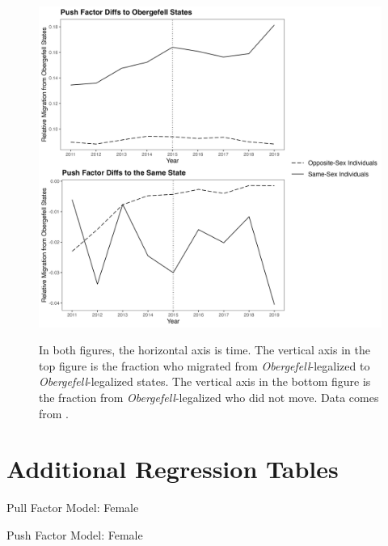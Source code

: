 \documentclass[12pt,letterpaper]{article}
\begin{document}
\begin{figure}[htbp]
    \centering
    \caption{}
    \label{fig: flows_ante_diffs_app}
    \includegraphics[width=.75\linewidth]{outputs/summary_stats/flows_ante_diffs_app.png}

    \vspace{0.5em}
    \begin{minipage}{0.75\linewidth}
        \footnotesize In both figures, the horizontal axis is time. The vertical axis in the top figure is the fraction who migrated from \textit{Obergefell}-legalized to \textit{Obergefell}-legalized states. The vertical axis in the bottom figure is the fraction from \textit{Obergefell}-legalized who did not move. Data comes from \citet{28}.
    \end{minipage}
\end{figure}

\FloatBarrier
\newpage
\section{Additional Regression Tables}
\begin{table}[htbp]
    \centering
    \caption{Pull Factor Model: Female}
    \label{tab: female_expost_model}
    
\end{table}
\begin{table}[htbp] %
    \centering
    \caption{Push Factor Model: Female}
    \label{tab: female_exante_model}
    
\end{table}
\end{document}
